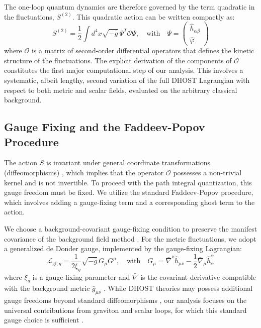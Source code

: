 \documentclass[twocolumn]{aastex631}
\begin{document}
The one-loop quantum dynamics are therefore governed by the term quadratic in the fluctuations, $S^{(2)}$. This quadratic action can be written compactly as:
\begin{equation}S^{(2)} = \frac{1}{2} \int d^4x \sqrt{-\bar{g}} \, \Psi^T \mathbf{\mathcal{O}} \Psi, \quad \text{with} \quad \Psi = \begin{pmatrix} \hat{h}_{\alpha\beta} \\ \hat{\varphi} \end{pmatrix}\end{equation}
where $\mathbf{\mathcal{O}}$ is a matrix of second-order differential operators that defines the kinetic structure of the fluctuations. The explicit derivation of the components of $\mathbf{\mathcal{O}}$ constitutes the first major computational step of our analysis. This involves a systematic, albeit lengthy, second variation of the full DHOST Lagrangian with respect to both metric and scalar fields, evaluated on the arbitrary classical background. \citep{langlois2018degeneratehigherorderscalartensordhost,langlois2020quadraticdhosttheoriesrevisited}

\subsection{Gauge Fixing and the Faddeev-Popov Procedure}
The action $S$ is invariant under general coordinate transformations (diffeomorphisms) \citep{schucker2018gaugetheoreticalunderpinningsgeneral,gomes2022samediffconceptualsimilaritiesgauge}, which implies that the operator $\mathbf{\mathcal{O}}$ possesses a non-trivial kernel and is not invertible. To proceed with the path integral quantization, this gauge freedom must be fixed. We utilize the standard Faddeev-Popov procedure, which involves adding a gauge-fixing term and a corresponding ghost term to the action.

We choose a background-covariant gauge-fixing condition to preserve the manifest covariance of the background field method \citep{ferrari2001algebraicaspectsbackgroundfield,suzuki2015backgroundfieldmethodgradient}. For the metric fluctuations, we adopt a generalized de Donder gauge, implemented by the gauge-fixing Lagrangian:
\begin{equation}\mathcal{L}_{\text{gf},g} = \frac{1}{2\xi_g} \sqrt{-\bar{g}} \, G_\mu G^\mu, \quad \text{with} \quad G_\mu = \bar{\nabla}^\nu \hat{h}_{\mu\nu} - \frac{1}{2} \bar{\nabla}_\mu \hat{h}^\alpha_\alpha\end{equation}
where $\xi_g$ is a gauge-fixing parameter and $\bar{\nabla}$ is the covariant derivative compatible with the background metric $\bar{g}_{\mu\nu}$ \citep{prinz2025brstdoublecomplexcoupling,prinz2025symmetricghostlagrangedensities}. While DHOST theories may possess additional gauge freedoms beyond standard diffeomorphisms \citep{defelice2021nonlineardefinitionshadowymode}, our analysis focuses on the universal contributions from graviton and scalar loops, for which this standard gauge choice is sufficient \citep{defelice2021nonlineardefinitionshadowymode}.
\end{document}
